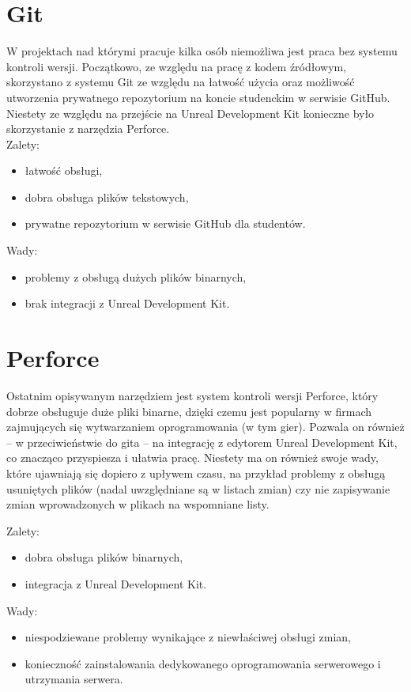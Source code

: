 \section{Git}

W projektach nad którymi pracuje kilka osób niemożliwa jest praca bez systemu kontroli wersji. Początkowo, ze względu na pracę z kodem źródłowym, skorzystano z systemu Git ze względu na łatwość użycia oraz możliwość utworzenia prywatnego repozytorium na koncie studenckim w serwisie GitHub. Niestety ze względu na przejście na Unreal Development Kit konieczne było skorzystanie z narzędzia Perforce.\\

Zalety:
\begin{itemize}
\item łatwość obsługi,
\item dobra obsługa plików tekstowych,
\item prywatne repozytorium w serwisie GitHub dla studentów.
\end{itemize}

Wady:
\begin{itemize}
\item problemy z obsługą dużych plików binarnych,
\item brak integracji z Unreal Development Kit.
\end{itemize}

\section{Perforce}

Ostatnim opisywanym narzędziem jest system kontroli wersji Perforce, który dobrze obsługuje duże pliki binarne, dzięki czemu jest popularny w firmach zajmujących się wytwarzaniem oprogramowania (w tym gier). Pozwala on również -- w przeciwieństwie do gita -- na integrację z edytorem Unreal Development Kit, co znacząco przyspiesza i ułatwia pracę. Niestety ma on również swoje wady, które ujawniają się dopiero z upływem czasu, na przykład problemy z obsługą usuniętych plików (nadal uwzględniane są w listach zmian) czy nie zapisywanie zmian wprowadzonych w plikach na wspomniane listy.

Zalety:
\begin{itemize}
\item dobra obsługa plików binarnych,
\item integracja z Unreal Development Kit.
\end{itemize}

Wady:
\begin{itemize}
\item niespodziewane problemy wynikające z niewłaściwej obsługi zmian,
\item konieczność zainstalowania dedykowanego oprogramowania serwerowego i utrzymania serwera.
\end{itemize}